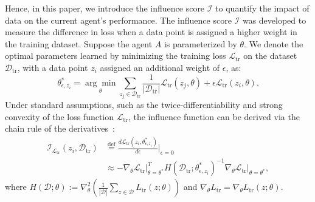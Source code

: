 
Hence, in this paper, we introduce the influence score $\mathcal{I}$ to quantify the impact of data on the current agent's performance. 
The influence score $\mathcal{I}$ was developed to measure the difference in loss when a data point is assigned a higher weight in the training dataset.  Suppose the agent $A$ is parameterized by $\theta$. We denote the optimal parameters learned by minimizing the training loss $\mathcal{L}_{\text{tr}}$ on the dataset $\mathcal{D}_{\text{tr}}$, with a data point $z_i$ assigned an additional weight of $\epsilon$, as:
\begin{equation}
    \theta_{\epsilon, z_i}^* = \underset{\theta}{\arg\min} \sum_{z_j\in \mathcal{D}_{\text{tr}}} \frac{1}{|\mathcal{D}_{\text{tr}}|} \mathcal{L}_{\text{tr}}(z_j, \theta) + \epsilon \mathcal{L}_{\text{tr}}(z_i, \theta).
\end{equation}
Under standard assumptions, such as the twice-differentiability and strong convexity of the loss function $\mathcal{L}_{\text{tr}}$, the influence function can be derived via the chain rule of the derivatives~\cite{DBLP:conf/icml/KohL17}:
\begin{equation}
\begin{split}
    \mathcal{I}_{\mathcal{L}_{\text{tr}}}(z_i, \mathcal{D}_{\text{tr}}) &\stackrel{\text{def}}{=} \frac{d \mathcal{L}_{\text{tr}}(z_i, \theta_{\epsilon, z_i}^*)}{d\epsilon} \bigg|_{\epsilon=0} \\
    &\approx -\nabla_\theta \mathcal{L}_{\text{tr}} \big|_{\theta=\theta^*}^T H(\mathcal{D}_{\text{tr}}; \theta_{\epsilon, z_i}^*)^{-1} \nabla_\theta \mathcal{L}_{\text{tr}} \big|_{\theta=\theta^*},
    \label{equation:influence score}
\end{split}
\end{equation}
where $H(\mathcal{D}; \theta) := \nabla_\theta^2\left(\frac{1}{|\mathcal{D}|} \sum_{z\in \mathcal{D}}L_{\text{tr}}(z; \theta)\right)$ and $\nabla_\theta L_{\text{tr}} = \nabla_\theta L_{\text{tr}}(z;\theta)$.

